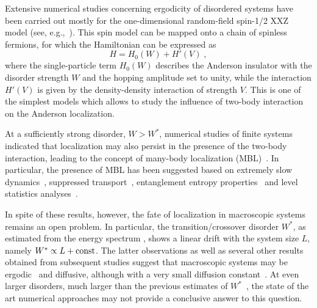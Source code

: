 \documentclass[twocolumn,pre,superscriptaddress,10pt,aps,floatfix]{revtex4-1}
\begin{document}
Extensive numerical studies concerning ergodicity of disordered systems have been carried out mostly for the one-dimensional random-field spin-1/2 XXZ model (see, e.g.,~\cite{pal10,barisic10,luitz15,luitz16,torres15,bera15,Hauschild_2016,Devakul2015,bertrand_garcia_16,Doggen2018,suntajs_bonca_20a, suntajs_2020, sierant_lewenstein_20}). 
This spin model can be mapped onto a chain of spinless fermions, for which the Hamiltonian can be expressed as
\begin{equation} \label{def_H_general}
    H = H_0(W) + H'(V) \;,
\end{equation}
where the single-particle term $H_0(W)$ describes the Anderson insulator with the disorder strength $W$ and the hopping amplitude set to unity, while the interaction $H'(V)$ is given by the density-density interaction of strength $V$.  
This is one of the simplest models which allows to study the influence of two-body interaction on the Anderson localization.

At a sufficiently strong disorder, $W>W^*$, numerical studies of finite systems indicated that localization may also persist in the presence of the two-body interaction, leading to the concept of many-body localization (MBL)~\cite{basko06,oganesyan07}. In particular, the presence of MBL has been suggested based on extremely slow dynamics~\cite{znidaric08,serbyn13_1,mierzejewski2016,luschen17,bordia2017_1,serbyn2017,Bera2019,chanda2020}, suppressed transport~\cite{berkelbach10, lev15, barisic16, steinigeweg16, bera2017, prelovsek116}, entanglement entropy properties~\cite{znidaric08,bardarson12,kjall14,baygan15, pietracaprina_parisi_17} and level statistics analyses~\cite{oganesyan07,pal10,luitz15,zakrzewski16,sierant_zakrzewski_19}.
 
In spite of these results, however, the fate of localization in macroscopic systems remains an open problem. 
In particular, the transition/crossover disorder $W^*$, as estimated from the energy spectrum \cite{suntajs_bonca_20a,suntajs_2020}, shows a linear drift with the system size $L$, namely $W^* \propto L +{\rm const}$. The latter observations as well as several other results obtained from subsequent studies suggest that macroscopic systems may be ergodic~\cite{kieferemmanouilidis_unanyan_20, sels2020, kieferemmanouilidis_unanyan_21, leblond_sels_21, vidmar2021, Sels_dilute_2021,Sels_2022,evers2023} and diffusive, although with a very small diffusion constant~\cite{barisic10}. At even larger disorders, much larger than the previous estimates of $W^*$~\cite{sierant2022,Morningstar2022}, the state of the art numerical approaches may not provide a conclusive answer to this question\cite{abanin2019,Panda2020,abanin_bardarson_21,sierant_lewenstein_20,crowley_chandran_22,bolther_kehrein_22}.
\end{document}
